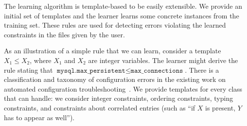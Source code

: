 The learning algorithm is template-based to be easily extensible. 
We provide an initial set of templates and the
learner learns some concrete instances from the training set. These
rules are used for detecting errors violating the learned constraints
in the files given by the user.

As an illustration of a simple rule that we can learn, consider a template
 $X_1 \le X_2$, where $X_1$ and $X_2$ are
integer variables. The learner might derive the rule stating that
$\texttt{mysql.max\_persistent} \le \texttt{max\_connections}$. There is a classification and taxonomy of configuration errors in the 
existing work on automated configuration troubleshooting~\cite{yin11anempirical, configdataset}. We provide templates for every class that \app can handle: we consider integer constraints, ordering
constraints, typing constraints, and constraints about correlated entries (such as ``if $X$ is present, $Y$ has to appear as well''). 


